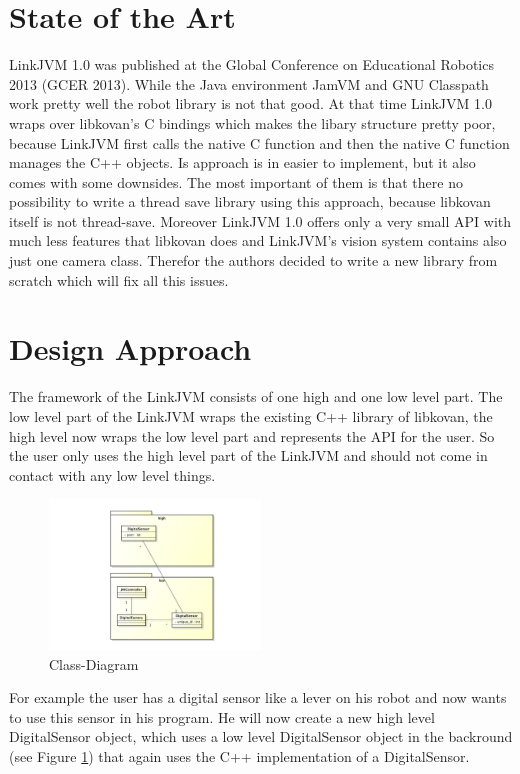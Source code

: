 \documentclass{juniorjournal}
\begin{document}
\section{State of the Art}
LinkJVM 1.0 was published at the Global Conference on Educational Robotics 2013 (GCER 2013).
While the Java environment JamVM and GNU Classpath work pretty well the robot library is not that good.
At that time LinkJVM 1.0 wraps over libkovan's C bindings which makes the libary structure pretty poor, because LinkJVM first calls the native C function and then the native C function manages the C++ objects.
Is approach is in easier to implement, but it also comes with some downsides.
The most important of them is that there no possibility to write a thread save library using this approach, because libkovan itself is not thread-save.
Moreover LinkJVM 1.0 offers only a very small API with much less features that libkovan does and LinkJVM's vision system contains also just one camera class.
Therefor the authors decided to write a new library from scratch which will fix all this issues. 

\section{Design Approach}
\label{sec:design-approach}
The framework of the LinkJVM consists of one high and one low level part.
The low level part of the LinkJVM wraps the existing C++ library of libkovan, 
the high level now wraps the low level part and represents the API for the user.
So the user only uses the high level part of the LinkJVM and should not come in 
contact with any low level things.

\begin{figure}[htbp]
\centering
\includegraphics[width=0.5\textwidth]{images/Class-Diagram.pdf}
\caption{Class-Diagram}
\label{fig:Class-Diagram}
\end{figure}

For example the user has a digital sensor like a lever on his robot and now 
wants to use this sensor in his program. He will now create a new high level 
DigitalSensor object, which uses a low level DigitalSensor object in the 
backround (see Figure \ref{fig:Class-Diagram}) that again uses the C++ implementation of a DigitalSensor.
\end{document}
